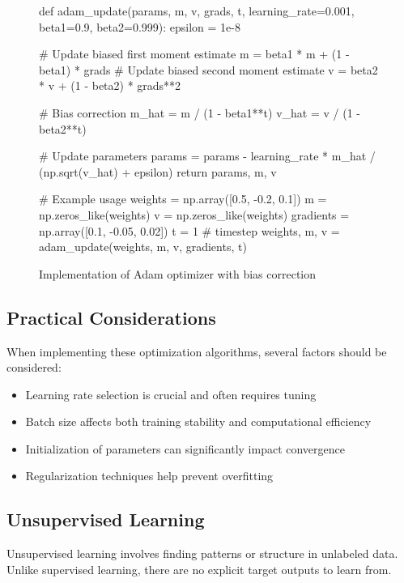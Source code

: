 \begin{figure}[h]
\begin{pythoncode}
def adam_update(params, m, v, grads, t, 
                learning_rate=0.001, beta1=0.9, beta2=0.999):
    epsilon = 1e-8
    
    # Update biased first moment estimate
    m = beta1 * m + (1 - beta1) * grads
    # Update biased second moment estimate
    v = beta2 * v + (1 - beta2) * grads**2
    
    # Bias correction
    m_hat = m / (1 - beta1**t)
    v_hat = v / (1 - beta2**t)
    
    # Update parameters
    params = params - learning_rate * m_hat / (np.sqrt(v_hat) + epsilon)
    return params, m, v

# Example usage
weights = np.array([0.5, -0.2, 0.1])
m = np.zeros_like(weights)
v = np.zeros_like(weights)
gradients = np.array([0.1, -0.05, 0.02])
t = 1  # timestep
weights, m, v = adam_update(weights, m, v, gradients, t)
\end{pythoncode}
\caption{Implementation of Adam optimizer with bias correction}
\label{fig:adam_implementation}
\end{figure}

\subsection{Practical Considerations}

When implementing these optimization algorithms, several factors should be considered:

\begin{itemize}[noitemsep]
    \item Learning rate selection is crucial and often requires tuning
    \item Batch size affects both training stability and computational efficiency
    \item Initialization of parameters can significantly impact convergence
    \item Regularization techniques help prevent overfitting
\end{itemize}

\subsection{Unsupervised Learning}

Unsupervised learning involves finding patterns or structure in unlabeled data. Unlike supervised learning, there are no explicit target outputs to learn from.

